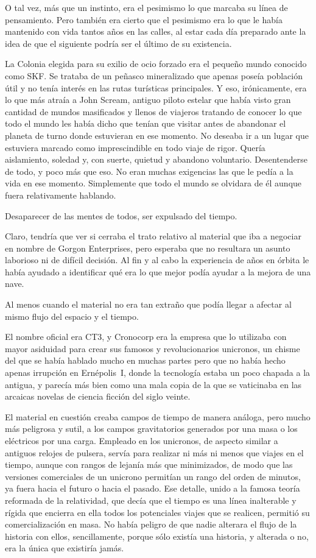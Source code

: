 O tal vez, más que un instinto, era el pesimismo lo que marcaba su línea de pensamiento. Pero también era cierto que el pesimismo era lo que le había mantenido con vida tantos años en las calles, al estar cada día preparado ante la idea de que el siguiente podría ser el último de su existencia.

La Colonia elegida para su exilio de ocio forzado era el pequeño mundo conocido como SKF. Se trataba de un peñasco mineralizado que apenas poseía población útil y no tenía interés en las rutas turísticas principales. Y eso, irónicamente, era lo que más atraía a John Scream, antiguo piloto estelar que había visto gran cantidad de mundos masificados y llenos de viajeros tratando de conocer lo que todo el mundo les había dicho que tenían que visitar antes de abandonar el planeta de turno donde estuvieran en ese momento. No deseaba ir a un lugar que estuviera marcado como imprescindible en todo viaje de rigor. Quería aislamiento, soledad y, con suerte, quietud y abandono voluntario. Desentenderse de todo, y poco más que eso. No eran muchas exigencias las que le pedía a la vida en ese momento. Simplemente que todo el mundo se olvidara de él aunque fuera relativamente hablando.

Desaparecer de las mentes de todos, ser expulsado del tiempo.

Claro, tendría que ver si cerraba el trato relativo al material que iba a negociar en nombre de Gorgon Enterprises, pero esperaba que no resultara un asunto laborioso ni de difícil decisión. Al fin y al cabo la experiencia de años en órbita le había ayudado a identificar qué era lo que mejor podía ayudar a la mejora de una nave.

Al menos cuando el material no era tan extraño que podía llegar a afectar al mismo flujo del espacio y el tiempo.

El nombre oficial era CT3, y Cronocorp era la empresa que lo utilizaba con mayor asiduidad para crear sus famosos y revolucionarios unicronos, un chisme del que se había hablado mucho en muchas partes pero que no había hecho apenas irrupción en Ernépolis~I, donde la tecnología estaba un poco chapada a la antigua, y parecía más bien como una mala copia de la que se vaticinaba en las arcaicas novelas de ciencia ficción del siglo veinte.

El material en cuestión creaba campos de tiempo de manera análoga, pero mucho más peligrosa y sutil, a los campos gravitatorios generados por una masa o los eléctricos por una carga. Empleado en los unicronos, de aspecto similar a antiguos relojes de pulsera, servía para realizar ni más ni menos que viajes en el tiempo, aunque con rangos de lejanía más que minimizados, de modo que las versiones comerciales de un unicrono permitían un rango del orden de minutos, ya fuera hacia el futuro o hacia el pasado. Ese detalle, unido a la famosa teoría reformada de la relatividad, que decía que el tiempo es una línea inalterable y rígida que encierra en ella todos los potenciales viajes que se realicen, permitió su comercialización en masa. No había peligro de que nadie alterara el flujo de la historia con ellos, sencillamente, porque sólo existía una historia, y alterada o no, era la única que existiría jamás.

